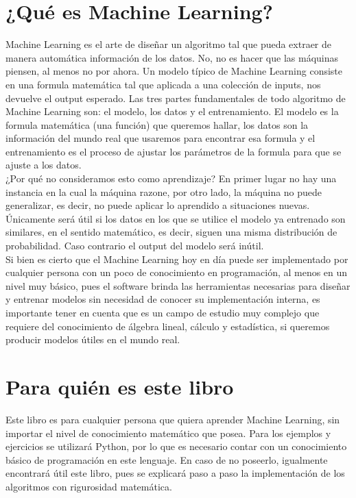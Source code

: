 \section{¿Qué es Machine Learning?}

Machine Learning es el arte de diseñar un algoritmo tal que
pueda extraer de manera automática información de los datos. 
No, no es hacer que las máquinas piensen, al menos no por ahora. Un modelo típico de Machine Learning consiste en una formula matemática
tal que aplicada a una colección de inputs, nos devuelve el output esperado.
Las tres partes fundamentales de todo algoritmo de Machine Learning son: el modelo, los datos y el entrenamiento.
El modelo es la formula matemática (una función) que queremos hallar, los datos son la información del mundo real que usaremos para encontrar esa formula 
y el entrenamiento es el proceso de ajustar los parámetros de la formula para que se ajuste a los datos.\\

¿Por qué no consideramos esto como aprendizaje? En primer lugar no hay una instancia en la cual la máquina razone, por otro lado, 
la máquina no puede generalizar, es decir, no puede aplicar lo aprendido a situaciones nuevas. Únicamente será útil si 
los datos en los que se utilice el modelo ya entrenado son similares, en el sentido matemático, es decir, siguen una misma distribución
de probabilidad. Caso contrario el output del modelo será inútil.\\ 

Si bien es cierto que el Machine Learning hoy en día 
puede ser implementado por cualquier persona con un poco de conocimiento en programación,
al menos en un nivel muy básico, pues el software brinda las herramientas necesarias para diseñar
y entrenar modelos sin necesidad de conocer su implementación interna,
es importante tener en cuenta que es un campo de estudio muy complejo 
que requiere del conocimiento de álgebra lineal, cálculo y estadística, si queremos producir modelos útiles en el mundo real.

\section{Para quién es este libro}

Este libro es para cualquier persona que quiera aprender Machine Learning, sin importar el nivel de conocimiento matemático que posea.
Para los ejemplos y ejercicios se utilizará Python, por lo que es necesario contar con un conocimiento básico de programación en este lenguaje.
En caso de no poseerlo, igualmente encontrará útil este libro, pues se explicará paso a paso la implementación de los algoritmos con rigurosidad matemática.

